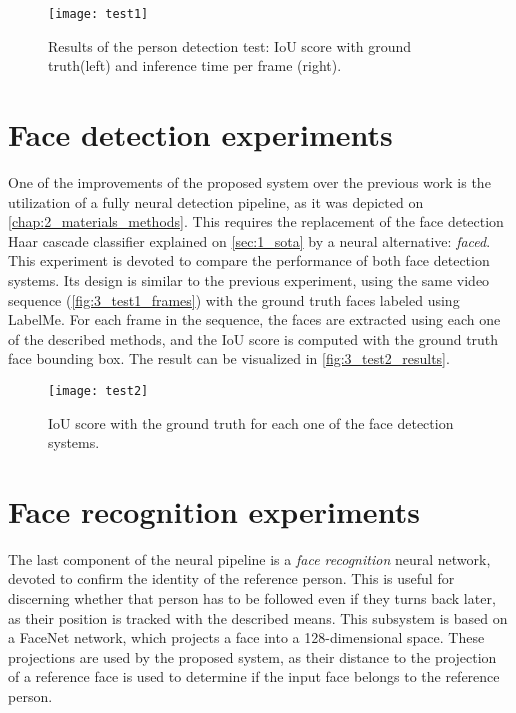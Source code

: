 \begin{figure}[h]
	\centering
	\texttt{[image: test1]}
	\caption{Results of the person detection test: IoU score with ground truth(left) and inference time per frame (right).}
	\label{fig:3_test1_results}
\end{figure}

\section{Face detection experiments}
\label{sec:3_test2}

One of the improvements of the proposed system over the previous work \cite{tfg} is the utilization of a fully neural detection pipeline, as it was depicted on \autoref{chap:2_materials_methods}. This requires the replacement of the face detection Haar cascade classifier explained on \autoref{sec:1_sota} by a neural alternative: \textit{faced}.\\

 This experiment is devoted to compare the performance of both face detection systems. Its design is similar to the previous experiment, using the same video sequence (\autoref{fig:3_test1_frames}) with the ground truth faces labeled using LabelMe. For each frame in the sequence, the faces are extracted using each one of the described methods, and the IoU score is computed with the ground truth face bounding box. The result can be visualized in \autoref{fig:3_test2_results}.

\begin{figure}[h]
	\centering
	\texttt{[image: test2]}
	\caption{IoU score with the ground truth for each one of the face detection systems.}
	\label{fig:3_test2_results}
\end{figure}

\section{Face recognition experiments}

\label{sec:3_test4}
The last component of the neural pipeline is a \textit{face recognition} neural network, devoted to confirm the identity of the reference person. This is useful for discerning whether that person has to be followed even if they turns back later, as their position is tracked with the described means. This subsystem is based on a FaceNet \cite{facenet} network, which projects a face into a 128-dimensional space. These projections are used by the proposed system, as their distance to the projection of a reference face is used to determine if the input face belongs to the reference person.\\

